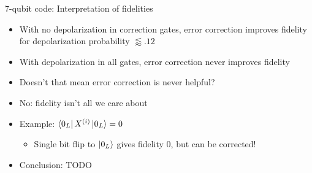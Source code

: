 \documentclass{beamer}
\begin{document}
\begin{frame}{7-qubit code: Interpretation of fidelities}
  \begin{itemize}
  \item With no depolarization in correction gates, error correction improves fidelity for depolarization probability $\lessapprox .12$
  \item With depolarization in all gates, error correction never improves fidelity
    \pause
  \item Doesn't that mean error correction is never helpful?
    \pause
  \item No: fidelity isn't all we care about
  \item Example: $\left\langle{0_L}\right\vert X^{(i)}\left\vert{0_L}\right\rangle=0$
    \begin{itemize}
    \item Single bit flip to $\left\vert{0_L}\right\rangle$ gives fidelity $0$, but can be corrected!
    \end{itemize}
    \pause
  \item Conclusion: TODO
  \end{itemize}
\end{frame}
\end{document}
